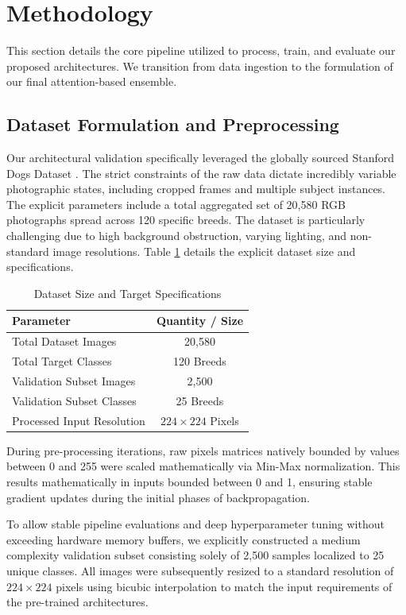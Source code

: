 \documentclass[conference]{IEEEtran}
\begin{document}
\section{Methodology}
This section details the core pipeline utilized to process, train, and evaluate our proposed architectures. We transition from data ingestion to the formulation of our final attention-based ensemble.

\subsection{Dataset Formulation and Preprocessing}
Our architectural validation specifically leveraged the globally sourced Stanford Dogs Dataset \cite{b3}. The strict constraints of the raw data dictate incredibly variable photographic states, including cropped frames and multiple subject instances. The explicit parameters include a total aggregated set of 20,580 RGB photographs spread across 120 specific breeds. The dataset is particularly challenging due to high background obstruction, varying lighting, and non-standard image resolutions. Table \ref{tab_dataset_size} details the explicit dataset size and specifications.

\begin{table}[htbp]
\caption{Dataset Size and Target Specifications}
\begin{center}
\begin{tabular}{|l|c|}
\hline
\textbf{Parameter} & \textbf{Quantity / Size} \\
\hline
Total Dataset Images & 20,580 \\
Total Target Classes & 120 Breeds \\
Validation Subset Images & 2,500 \\
Validation Subset Classes & 25 Breeds \\
Processed Input Resolution & $224 \times 224$ Pixels \\
\hline
\end{tabular}
\label{tab_dataset_size}
\end{center}
\end{table}

During pre-processing iterations, raw pixels matrices natively bounded by values between 0 and 255 were scaled mathematically via Min-Max normalization. This results mathematically in inputs bounded between 0 and 1, ensuring stable gradient updates during the initial phases of backpropagation. 

To allow stable pipeline evaluations and deep hyperparameter tuning without exceeding hardware memory buffers, we explicitly constructed a medium complexity validation subset consisting solely of 2,500 samples localized to 25 unique classes. All images were subsequently resized to a standard resolution of $224 \times 224$ pixels using bicubic interpolation to match the input requirements of the pre-trained architectures.
\end{document}
